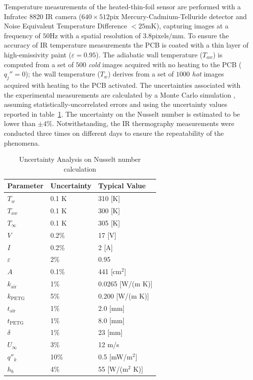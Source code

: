 Temperature measurements of the heated-thin-foil sensor are performed with a Infratec 8820 IR camera ($640 \times 512\mathrm{pix}$ Mercury-Cadmium-Telluride detector and Noise Equivalent Temperature Difference $< 25\mathrm{mK}$), capturing images at a frequency of $50\mathrm{Hz}$ with a spatial resolution of $3.8\mathrm{pixels/mm}$. To ensure the accuracy of IR temperature measurements the PCB is coated with a thin layer of high-emissivity paint ($\varepsilon = 0.95$). The adiabatic wall temperature ($T_{aw}$) is computed from a set of $500$ \textit{cold} images acquired with no heating to the PCB ( $q_j''= 0$); the wall temperature ($T_{w}$) derives from a set of $1000$ \textit{hot} images acquired with heating to the PCB activated. The uncertainties associated with the experimental measurements are calculated by a Monte Carlo simulation \citep{minkina2009infrared}, assuming statistically-uncorrelated errors and using the uncertainty values reported in table~\ref{tab:uncertainties}.
The uncertainty on the Nusselt number is estimated to be lower than $\pm 4\%$. Notwithstanding, the IR thermography measurements were conducted three times on different days to ensure the repeatability of the phenomena.

\begin{table}
\centering
\begin{tabular}{lll}
\toprule
    Parameter               & Uncertainty   & Typical Value \\ \midrule
    $T_w$                   & 0.1 K         & 310 [K]  \\
    $T_{aw}$                & 0.1 K         & 300 [K] \\
    $T_\infty$              & 0.1 K         & 305 [K] \\
    $V$                     & 0.2\%         & 17 [V] \\
    $I$                     & 0.2\%         & 2 [A] \\
    $\varepsilon$           & 2\%           & 0.95 \\
    $A$                     & 0.1\%         & 441 [cm$^2$] \\
    $k_{{\mathrm{air}}}$    & 1\%           & 0.0265 [W/(m K)] \\
    $k_{{\mathrm{PETG}}}$   & 5\%           & 0.200 [W/(m K)] \\
    $t_{{\mathrm{air}}}$    & 1\%           & 2.0 [mm] \\
    $t_{{\mathrm{PETG}}}$   & 1\%           & 8.0 [mm] \\
    $\delta$                & 1\%           & 23 [mm] \\
    $U_\infty$              & 3\%           & 12 m/s \\
    $q''_k$                 & 10\%          & 0.5 [mW/m$^2$] \\ 
    $h_b$                   & 4\%           & 55 [W/(m$^2$ K)] \\ 
\bottomrule
\end{tabular}
\caption{Uncertainty Analysis on Nusselt number calculation} \label{tab:uncertainties}
\end{table}

